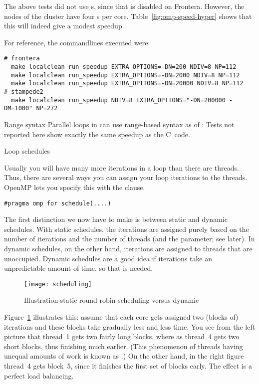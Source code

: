 The above tests did not use s,
since that is disabled on Frontera.
However, the  nodes
of the  cluster
have four s per core.
Table~\ref{fig:omp-speed-hyper} shows that this will indeed give a modest speedup.

For reference, the commandlines executed were:
\begin{verbatim}
# frontera
  make localclean run_speedup EXTRA_OPTIONS=-DN=200 NDIV=8 NP=112
  make localclean run_speedup EXTRA_OPTIONS=-DN=2000 NDIV=8 NP=112
  make localclean run_speedup EXTRA_OPTIONS=-DN=20000 NDIV=8 NP=112
# stampede2
  make localclean run_speedup NDIV=8 EXTRA_OPTIONS="-DN=200000 -DM=1000" NP=272
\end{verbatim}

\begin{cppnote}{Range syntax}
  Parallel loops in can use range-based syntax as of :
  Tests not reported here show exactly the same speedup as the C~code.
\end{cppnote}

 {Loop schedules}
\label{sec:schedule}

Usually you will have many more iterations in a loop than there are threads.
Thus, there are several ways you can assign your loop iterations to the threads.
OpenMP lets you specify this with the  clause.
\begin{lstlisting}
#pragma omp for schedule(....)
\end{lstlisting}

The first distinction we now have to make is between static and dynamic schedules.
With static schedules, the iterations are assigned purely based on the number
of iterations and the number of threads (and the  parameter; see later).
In dynamic schedules, on the other hand, iterations are assigned to threads that
are unoccupied. Dynamic schedules are a good idea if iterations take an unpredictable
amount of time, so that  is needed.

\begin{figure}[ht]
  \texttt{[image: scheduling]}
  \caption{Illustration static round-robin scheduling versus dynamic}
  \label{fig:omp-robin}
\end{figure}
%
Figure~\ref{fig:omp-robin} illustrates this: assume that each core
gets assigned two (blocks of) iterations and these blocks take
gradually less and less time. You see from the left picture that
thread~1 gets two fairly long blocks, where as thread~4 gets two short
blocks, thus finishing much earlier. (This phenomenon of threads
having unequal amounts of work is known as
.)
On the other hand, in the right figure thread~4 gets
block~5, since it finishes the first set of blocks early. The effect
is a perfect load balancing.

